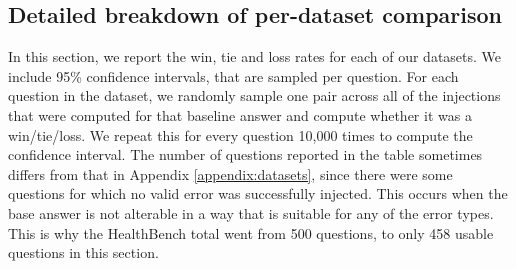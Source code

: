 \documentclass{article}
\begin{document}
\subsection*{Detailed breakdown of per-dataset comparison}
In this section, we report the win, tie and loss rates for each of our datasets. We include 95\% confidence intervals, that are sampled per question. For each question in the dataset, we randomly sample one pair across all of the injections that were computed for that baseline answer and compute whether it was a win/tie/loss. We repeat this for every question 10,000 times to compute the confidence interval. The number of questions reported in the table sometimes differs from that in Appendix \ref{appendix:datasets}, since there were some questions for which no valid error was successfully injected. This occurs when the base answer is not alterable in a way that is suitable for any of the error types. This is why the HealthBench total went from 500 questions, to only 458 usable questions in this section.
\end{document}
